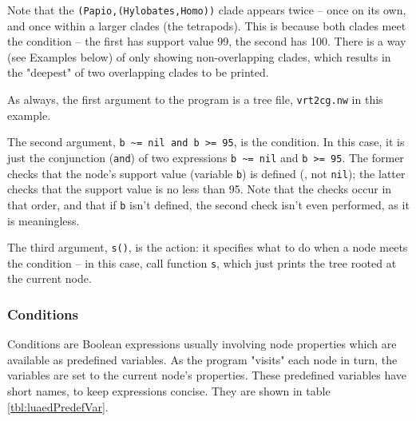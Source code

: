
\begin{samepage}

\end{samepage}

Note that the \texttt{(Papio,(Hylobates,Homo))} clade appears twice -- once on
its own, and once within a larger clades (the tetrapods). This is because both
clades meet the condition -- the first has support value 99, the second has 100.
There is a way (see Examples below) of only showing non-overlapping clades,
which results in the "deepest" of two overlapping clades to be printed.

\noindent{}As always, the first argument to the program is a tree file,
\texttt{vrt2cg.nw} in this example.

The second argument, \verb+b ~= nil and b >= 95+, is the condition.  In this
case, it is just the conjunction (\texttt{and}) of two expressions
\verb+b ~= nil+ and \texttt{b >= 95}.  The former checks that the node's support
value (variable \texttt{b}) is defined (\ie, not \texttt{nil}); the latter
checks that the support value is no less than 95. Note that the checks occur in
that order, and that if \texttt{b} isn't defined, the second check isn't even
performed, as it is meaningless.

The third argument, \texttt{s()}, is the action: it specifies what to do when a
node meets the condition -- in this case, call function \texttt{s},
which just prints the tree rooted at the current node.

\subsubsection{Conditions}

Conditions are Boolean expressions usually involving node properties which are
available as predefined variables. As the program "visits" each node in turn,
the variables are set to the current node's properties.  These predefined
variables have short names, to keep expressions concise. They are shown in table
\ref{tbl:luaedPredefVar}.


